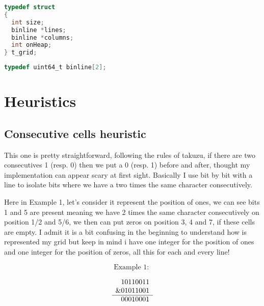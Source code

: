 \documentclass{article}
\begin{document}
\begin{minipage}{0.45\textwidth}
\begin{lstlisting}[language=C, caption={Grid Structure}, label=code1]
typedef struct
{
  int size;
  binline *lines;
  binline *columns;
  int onHeap;
} t_grid;
\end{lstlisting}
\end{minipage}
\hfill
\begin{minipage}{0.45\textwidth}
\begin{lstlisting}[language=C, caption={line structure}, label=code2]
typedef uint64_t binline[2];

\end{lstlisting}
\end{minipage}

\vspace{1em}


\section{Heuristics}
\subsection{Consecutive cells heuristic}

This one is pretty straightforward, following the rules of takuzu, if there are two consecutives 1 (resp. 0) then we put a 0 (resp. 1) before and after, thought my implementation can appear scary at first sight.
Basically I use bit by bit with a line to isolate bits where we have a two times the same character consecutively. 

Here in Example 1, let's consider it represent the position of ones, we can see bits 1 and 5 are present meaning we have 2 times the same character consecutively on position 1/2 and 5/6, we then can put zeros on position 3, 4 and 7, if these cells are empty. I admit it is a bit confusing in the beginning to understand how is represented my grid but keep in mind i have one integer for the position of ones and one integer for the position of zeros, all this for each and every line!


\[
\text{Example 1: }
\]

\[
\begin{array}{c@{}c}
  & 10110011 \\
\& & 01011001 \\
\hline
  & 00010001 \\
\end{array}
\]
\vspace{1em}
\end{document}
